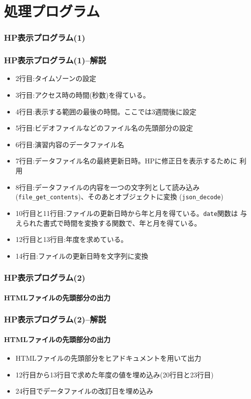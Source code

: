 \section{処理プログラム}
\begin{frame}[containsverbatim]
 \frametitle{HP表示プログラム(1)}
\end{frame}
\begin{frame}[containsverbatim]
 \frametitle{HP表示プログラム(1)--解説}
\begin{itemize}
 \item 2行目:タイムゾーンの設定
 \item 3行目:アクセス時の時間(秒数)を得ている。
 \item 4行目:表示する範囲の最後の時間。ここでは3週間後に設定
 \item 5行目:ビデオファイルなどのファイル名の先頭部分の設定
 \item 6行目:演習内容のデータファイル名
 \item 7行目:データファイル名の最終更新日時。HPに修正日を表示するために
       利用
 \item 8行目:データファイルの内容を一つの文字列として読み込み
       (\Verb+file_get_contents+)、そのあとオブジェクトに変換
       (\Verb+json_decode+)
 \item 10行目と11行目:ファイルの更新日時から年と月を得ている。\Verb+date+関数は
       与えられた書式で時間を変換する関数で、年と月を得ている。
 \item 12行目と13行目:年度を求めている。
 \item 14行目:ファイルの更新日時を文字列に変換
\end{itemize}
\end{frame}
\begin{frame}[containsverbatim]
 \frametitle{HP表示プログラム(2)}
 \framesubtitle{HTMLファイルの先頭部分の出力}
\end{frame}
\begin{frame}[containsverbatim]
 \frametitle{HP表示プログラム(2)--解説}
 \framesubtitle{HTMLファイルの先頭部分の出力}
 \begin{itemize}
  \item HTMLファイルの先頭部分をヒアドキュメントを用いて出力
  \item 12行目から13行目で求めた年度の値を埋め込み(20行目と23行目)
  \item 24行目でデータファイルの改訂日を埋め込み
 \end{itemize}
\end{frame}
